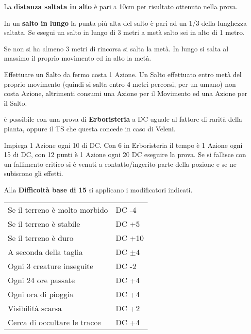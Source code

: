 \documentclass[landscape,10pt,a4paper]{article}
\begin{document}
\begin{multicols}{3}
\begin{dmbox}[title=Atletica - pagina \pageref{atletica}]
La \textbf{distanza saltata in alto} è pari a 10cm per risultato ottenuto nella prova.

In un \textbf{salto in lungo} la punta più alta del salto è pari ad un 1/3 della lunghezza saltata. Se esegui un salto in lungo di 3 metri a metà salto sei in alto di 1 metro.

Se non si ha almeno 3 metri di rincorsa si salta la metà. In lungo si salta al massimo il proprio movimento ed in alto la metà.

Effettuare un Salto da fermo costa 1 Azione. Un Salto effettuato entro metà del proprio movimento (quindi si salta entro 4 metri percorsi, per un umano) non costa Azione, altrimenti consumi una Azione per il Movimento ed una Azione per il Salto.
\end{dmbox}

\begin{dmbox}[title=Identificare una pozione o veleno naturale - pagina \pageref{identificarepozioni}]
è possibile con una prova di \textbf{Erboristeria} a DC uguale al fattore di rarità della pianta, oppure il TS che questa concede in caso di Veleni.

Impiega 1 Azione ogni 10 di DC. Con 6 in Erboristeria il tempo è 1 Azione ogni 15 di DC, con 12 punti è 1 Azione ogni 20 DC eseguire la prova. Se si fallisce con un fallimento critico si è venuti a contatto/ingerito parte della pozione e se ne subiscono gli effetti.
\end{dmbox}


\begin{dmbox}[title=Seguire Tracce - pagina \pageref{seguiretracce}]
	Alla \textbf{Difficoltà base di 15} si applicano i modificatori indicati.\\
	
	\noindent\begin{tabular}{ll}
		Se il terreno è molto morbido& DC -4\\
		Se il terreno è stabile& DC +5\\
		Se il terreno è duro& DC +10\\
		A seconda della taglia& DC $\pm4$\\
		Ogni 3 creature inseguite& DC -2\\
		Ogni 24 ore passate& DC +4\\
		Ogni ora di pioggia& DC +4\\
		Visibilità scarsa& DC +2\\
		Cerca di occultare le tracce& DC +4\\
	\end{tabular}
\end{dmbox}


\end{multicols}
\end{document}
